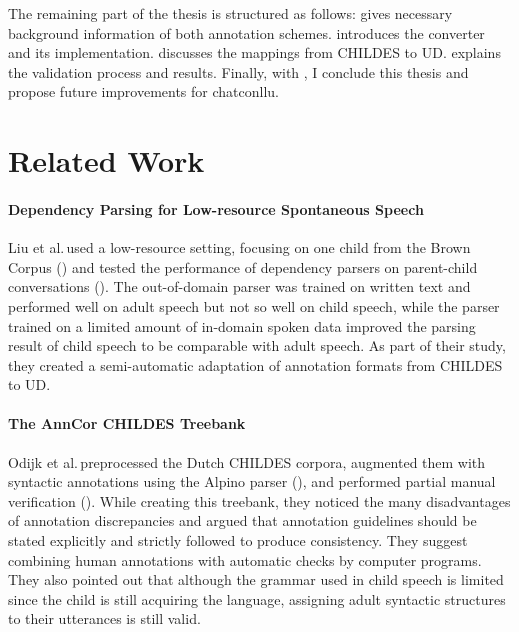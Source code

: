 The remaining part of the thesis is structured as follows:  gives necessary background information of both annotation schemes.  introduces the converter and its implementation.  discusses the mappings from CHILDES to UD.  explains the validation process and results. Finally, with , I conclude this thesis and propose future improvements for chatconllu.

\section{Related Work}

\paragraph{Dependency Parsing for Low-resource Spontaneous Speech}%
\label{par:zoey}
Liu et al.\,used a low-resource setting, focusing on one child from the Brown Corpus (\cite{brown1973}) and tested the performance of dependency parsers on parent-child conversations (\cite{liu2021}). The out-of-domain parser was trained on written text and performed well on adult speech but not so well on child speech, while the parser trained on a limited amount of in-domain spoken data improved the parsing result of child speech to be comparable with adult speech. As part of their study, they created a semi-automatic adaptation of annotation formats from CHILDES to UD.

\paragraph{The AnnCor CHILDES Treebank}%
Odijk et al.\,preprocessed the Dutch CHILDES corpora, augmented them with syntactic annotations using the Alpino parser (\cite{bouma}), and performed partial manual verification (\cite{odijk2018anncor}). While creating this treebank, they noticed the many disadvantages of annotation discrepancies and argued that annotation guidelines should be stated explicitly and strictly followed to produce consistency. They suggest combining human annotations with automatic checks by computer programs. They also pointed out that although the grammar used in child speech is limited since the child is still acquiring the language, assigning adult syntactic structures to their utterances is still valid.
